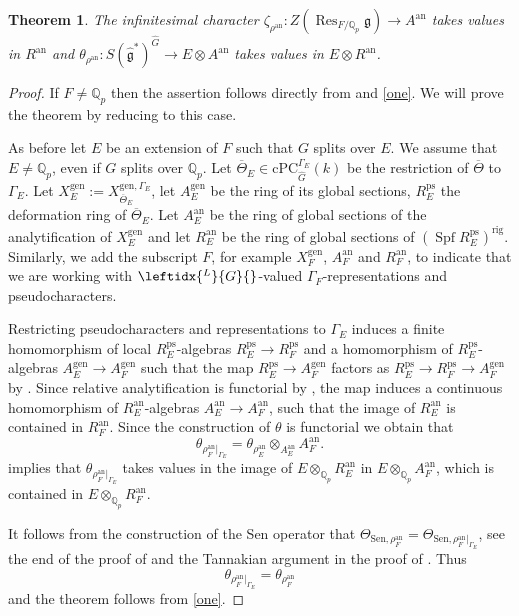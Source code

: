 \documentclass{amsart}
\newtheorem{thm}[prop]{Theorem}
\theoremstyle{definition}
\theoremstyle{remark}
\DeclareMathOperator{\Res}{Res}
\newcommand{\Qp}{\mathbb {Q}_p}
\newcommand{\ana}{\mathrm{an}}
\newcommand{\gen}{\mathrm{gen}}
\DeclareMathOperator{\Spf}{Spf}
\newcommand{\rig}{\mathrm{rig}}
\newcommand{\cPC}{\mathrm{cPC}}
\newcommand{\Thetabar}{\overline{\Theta}}
\newcommand{\ps}{\mathrm{ps}}
\newcommand{\Ghat}{\widehat{G}}
\newcommand{\LG}{\leftidx{^L}{G}{}}
\newcommand{\ghat}{\widehat{\mathfrak g}}
\newcommand{\Sen}{\mathrm{Sen}}
\begin{document}
 
\begin{thm}\label{main} 
The infinitesimal character
$\zeta_{\rho^{\ana}}: Z(\Res_{F/\Qp}\mathfrak g) \rightarrow A^{\ana}$ takes values in $R^{\ana}$ and 
$\theta_{\rho^{\ana}}: S(\ghat^*)^{\Ghat}\rightarrow E\otimes A^{\ana}$ takes values in $E\otimes R^{\ana}$.
\end{thm}
\begin{proof} If $F\neq \Qp$ then the assertion 
follows directly from  and \eqref{one}. We will prove the theorem by reducing to this case. 

As before let $E$ be an extension of $F$ such that 
$G$ splits over $E$. We assume that $E\neq \Qp$, 
even if $G$ splits over $\Qp$. 
Let $\Thetabar_E\in \cPC^{\Gamma_E}_{\Ghat}(k)$ be the 
restriction of $\Thetabar$ to $\Gamma_E$. 
Let $X^{\gen}_E:= X^{\gen, \Gamma_E}_{\Thetabar_E}$, let $A^{\gen}_E$ be the ring of its global sections, $R^{\ps}_E$ the deformation ring 
of $\Thetabar_E$. 
Let $A^{\ana}_E$ be the ring of global sections 
of the analytification of $X^{\gen}_E$ and 
let $R^{\ana}_E$ be the ring of global sections
of $(\Spf R^{\ps}_E)^{\rig}$. Similarly, we add the subscript $F$, for example
 $X^{\gen}_F$, $A^{\ana}_F$ and $R^{\ana}_F$, 
 to indicate that we are working with $\LG$-valued $\Gamma_F$-representations 
 and pseudocharacters. 
 
 Restricting pseudocharacters and representations to $\Gamma_E$ induces a finite homomorphism of 
 local $R^{\ps}_E$-algebras $R^{\ps}_E\rightarrow R^{\ps}_F$ and a homomorphism of $R^{\ps}_E$-algebras
 $A^{\gen}_E\rightarrow A^{\gen}_F$  such that the map
 $R^{\ps}_E\rightarrow A^{\gen}_F$ factors 
 as $R^{\ps}_E\rightarrow R^{\ps}_F\rightarrow A^{\gen}_F$ by \cite[Section 8.4]{defG}. Since relative analytification is functorial by ,
  the map induces
 a continuous homomorphism of $R^{\ana}_E$-algebras
 $A^{\ana}_E \rightarrow A^{\ana}_F$, such that 
 the image of $R^{\ana}_E$ is contained in $R^{\ana}_F$. Since the construction of $\theta$ is  functorial we obtain that 
 \begin{equation}\label{restiction} 
 \theta_{\rho^{\ana}_F |_{\Gamma_E}} = \theta_{\rho^{\ana}_E}\otimes_{A^{\ana}_E} A^{\ana}_F.
 \end{equation} 
  implies that $\theta_{\rho^{\ana}_F |_{\Gamma_E}}$ takes values in the image 
 of $E\otimes_{\Qp} R^{\ana}_E$ in $E\otimes_{\Qp} A^{\ana}_F$, which is contained in $E\otimes_{\Qp}R^{\ana}_F$. 
 
 It follows from the construction of the Sen operator 
  that 
  $\Theta_{\Sen,\rho_F^{\ana}}=\Theta_{\Sen,\rho_F^{\ana}|_{\Gamma_E}}$, see the end of the proof of \cite[Theorem 3.1]{DPS} and 
  the Tannakian argument in the proof of 
  \cite[Lemma 4.6]{DPS}. Thus 
  \begin{equation}\label{restiction2} 
 \theta_{\rho^{\ana}_F |_{\Gamma_E}} = \theta_{\rho^{\ana}_F}
 \end{equation} 
 and the theorem follows from \eqref{one}. \end{proof}
 
\end{document}
